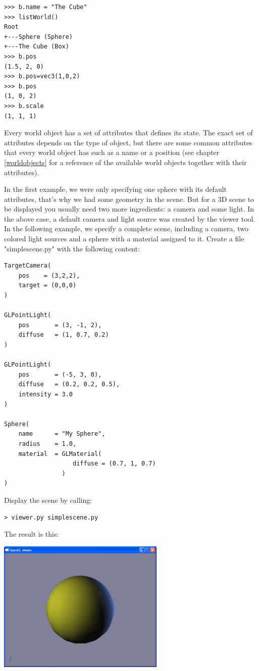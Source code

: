 \begin{verbatim}
>>> b.name = "The Cube"
>>> listWorld()
Root
+---Sphere (Sphere)
+---The Cube (Box)
>>> b.pos
(1.5, 2, 0)
>>> b.pos=vec3(1,0,2)
>>> b.pos
(1, 0, 2)
>>> b.scale
(1, 1, 1)
\end{verbatim}

Every world object has a set of attributes that defines its state.
The exact set of attributes depends on the type of object, but there
are some common attributes that every world object has such as a name or
a position (see chapter \ref{worldobjects} for a reference of the available
world objects together with their attributes).

In the first example, we were only specifying one sphere with its default
attributes, that's why we had some geometry in the scene. But for a 3D scene
to be displayed you usually need two more ingredients: a camera and some 
light. In the above case, a default camera and light source was created
by the viewer tool. In the following example, we specify a complete scene,
including a camera, two colored light sources and a sphere with a material
assigned to it. Create a file "simplescene.py" with the following content:

\begin{verbatim}
TargetCamera(
    pos    = (3,2,2),
    target = (0,0,0)
)

GLPointLight(
    pos       = (3, -1, 2),
    diffuse   = (1, 0.7, 0.2)
)

GLPointLight(
    pos       = (-5, 3, 0),
    diffuse   = (0.2, 0.2, 0.5),
    intensity = 3.0
)

Sphere(
    name      = "My Sphere",
    radius    = 1.0,
    material  = GLMaterial(
                   diffuse = (0.7, 1, 0.7)
                )
)
\end{verbatim}

Display the scene by calling:

\begin{verbatim}
> viewer.py simplescene.py
\end{verbatim}

The result is this:

\begin{center}
\includegraphics[width=8cm]{pics/simplescene1}
\end{center}

